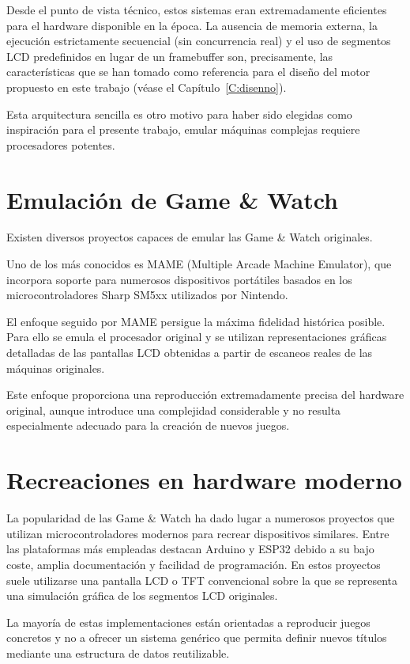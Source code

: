\documentclass[../main.tex]{subfiles}
\begin{document}
	Desde el punto de vista técnico, estos sistemas eran extremadamente eficientes para el hardware disponible en la época. La ausencia de memoria externa, la ejecución estrictamente secuencial (sin concurrencia real) y el uso de segmentos LCD predefinidos en lugar de un framebuffer son, precisamente, las características que se han tomado como referencia para el diseño del motor propuesto en este trabajo (véase el Capítulo~\ref{C:disenno}).

	Esta arquitectura sencilla es otro motivo para haber sido elegidas como inspiración para el presente trabajo, emular máquinas complejas requiere procesadores potentes.


	\section{Emulación de Game \& Watch}
	Existen diversos proyectos capaces de emular las Game \& Watch originales.

	Uno de los más conocidos es MAME (Multiple Arcade Machine Emulator), que incorpora soporte para numerosos dispositivos portátiles basados en los microcontroladores Sharp SM5xx utilizados por Nintendo.

	El enfoque seguido por MAME persigue la máxima fidelidad histórica posible. Para ello se emula el procesador original y se utilizan representaciones gráficas detalladas de las pantallas LCD obtenidas a partir de escaneos reales de las máquinas originales.

	Este enfoque proporciona una reproducción extremadamente precisa del hardware original, aunque introduce una complejidad considerable y no resulta especialmente adecuado para la creación de nuevos juegos.

	\section{Recreaciones en hardware moderno}
	La popularidad de las Game \& Watch ha dado lugar a numerosos proyectos que utilizan microcontroladores modernos para recrear dispositivos similares. Entre las plataformas más empleadas destacan Arduino y ESP32 debido a su bajo coste, amplia documentación y facilidad de programación. En estos proyectos suele utilizarse una pantalla LCD o TFT convencional sobre la que se representa una simulación gráfica de los segmentos LCD originales.

	La mayoría de estas implementaciones están orientadas a reproducir juegos concretos y no a ofrecer un sistema genérico que permita definir nuevos títulos mediante una estructura de datos reutilizable.
\end{document}
